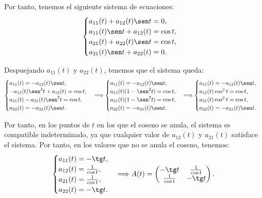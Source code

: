 \begin{ejercicio}
    Por tanto, tenemos el siguiente sistema de ecuaciones:
    \begin{align*}
        \begin{cases}
            a_{11}(t) + a_{12}(t)\sen t = 0,\\
            a_{11}(t)\sen t + a_{12}(t) = \cos t,\\
            a_{21}(t) + a_{22}(t)\sen t = \cos t,\\
            a_{21}(t)\sen t + a_{22}(t) = 0.
        \end{cases}
    \end{align*}

    Despuejando $a_{11}(t)$ y $a_{22}(t)$, tenemos que el sistema queda:
    \begin{align*}
        \begin{cases}
            a_{11}(t)= -a_{12}(t)\sen t,\\
            -a_{12}(t)\sen^2 t + a_{12}(t) = \cos t,\\
            a_{21}(t) - a_{21}(t)\sen^2 t = \cos t,\\
            a_{22}(t) = -a_{21}(t)\sen t.
        \end{cases}
        \Longrightarrow
        \begin{cases}
            a_{11}(t)= -a_{12}(t)\sen t,\\
            a_{12}(t)(1-\sen^2 t) = \cos t,\\
            a_{21}(t)(1-\sen^2 t) = \cos t,\\
            a_{22}(t) = -a_{21}(t)\sen t.
        \end{cases}
        \Longrightarrow
        \begin{cases}
            a_{11}(t)= -a_{12}(t)\sen t,\\
            a_{12}(t)\cos^2t = \cos t,\\
            a_{21}(t)\cos^2t = \cos t,\\
            a_{22}(t) = -a_{21}(t)\sen t.
        \end{cases}
    \end{align*}

    Por tanto, en los puntos de $t$ en los que el coseno se anula, el sistema es compatible indeterminado, ya que cualquier valor de $a_{12}(t)$ y $a_{21}(t)$ satisface el sistema. Por tanto, en los valores que no se anula el coseno, tenemos:
    \begin{equation*}
        \begin{cases}
            a_{11}(t)= -\tg t,\\
            a_{12}(t) = \frac{1}{\cos t},\\
            a_{21}(t) = \frac{1}{\cos t},\\
            a_{22}(t) = -\tg t.
        \end{cases}
        \Longrightarrow
        A(t) = \begin{pmatrix}
            -\tg t & \frac{1}{\cos t}\\
            \frac{1}{\cos t} & -\tg t
        \end{pmatrix}.
    \end{equation*}


\end{ejercicio}
